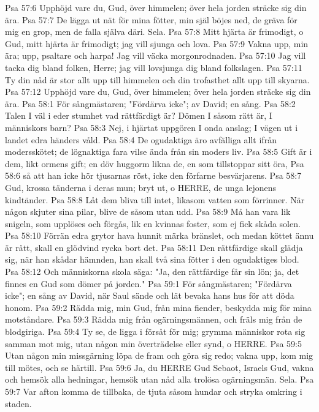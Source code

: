 Psa 57:6  Upphöjd vare du, Gud, över himmelen; över hela jorden sträcke sig din ära.
Psa 57:7  De lägga ut nät för mina fötter, min själ böjes ned, de gräva för mig en grop, men de falla själva däri. Sela.
Psa 57:8  Mitt hjärta är frimodigt, o Gud, mitt hjärta är frimodigt; jag vill sjunga och lova.
Psa 57:9  Vakna upp, min ära; upp, psaltare och harpa! Jag vill väcka morgonrodnaden.
Psa 57:10  Jag vill tacka dig bland folken, Herre; jag vill lovsjunga dig bland folkslagen.
Psa 57:11  Ty din nåd är stor allt upp till himmelen och din trofasthet allt upp till skyarna.
Psa 57:12  Upphöjd vare du, Gud, över himmelen; över hela jorden sträcke sig din ära.
Psa 58:1  För sångmästaren; "Fördärva icke"; av David; en sång.
Psa 58:2  Talen I väl i eder stumhet vad rättfärdigt är? Dömen I såsom rätt är, I människors barn?
Psa 58:3  Nej, i hjärtat uppgören I onda anslag; I vägen ut i landet edra händers våld.
Psa 58:4  De ogudaktiga äro avfälliga allt ifrån modersskötet; de lögnaktiga fara vilse ända från sin moders liv.
Psa 58:5  Gift är i dem, likt ormens gift; en döv huggorm likna de, en som tillstoppar sitt öra,
Psa 58:6  så att han icke hör tjusarnas röst, icke den förfarne besvärjarens.
Psa 58:7  Gud, krossa tänderna i deras mun; bryt ut, o HERRE, de unga lejonens kindtänder.
Psa 58:8  Låt dem bliva till intet, likasom vatten som förrinner. När någon skjuter sina pilar, blive de såsom utan udd.
Psa 58:9  Må han vara lik snigeln, som upplöses och förgås, lik en kvinnas foster, som ej fick skåda solen.
Psa 58:10  Förrän edra grytor hava hunnit märka bränslet, och medan köttet ännu är rått, skall en glödvind rycka bort det.
Psa 58:11  Den rättfärdige skall glädja sig, när han skådar hämnden, han skall två sina fötter i den ogudaktiges blod.
Psa 58:12  Och människorna skola säga: "Ja, den rättfärdige får sin lön; ja, det finnes en Gud som dömer på jorden."
Psa 59:1  För sångmästaren; "Fördärva icke"; en sång av David, när Saul sände och lät bevaka hans hus för att döda honom.
Psa 59:2  Rädda mig, min Gud, från mina fiender, beskydda mig för mina motståndare.
Psa 59:3  Rädda mig från ogärningsmännen, och fräls mig från de blodgiriga.
Psa 59:4  Ty se, de ligga i försåt för mig; grymma människor rota sig samman mot mig, utan någon min överträdelse eller synd, o HERRE.
Psa 59:5  Utan någon min missgärning löpa de fram och göra sig redo; vakna upp, kom mig till mötes, och se härtill.
Psa 59:6  Ja, du HERRE Gud Sebaot, Israels Gud, vakna och hemsök alla hedningar, hemsök utan nåd alla trolösa ogärningsmän. Sela.
Psa 59:7  Var afton komma de tillbaka, de tjuta såsom hundar och stryka omkring i staden.
